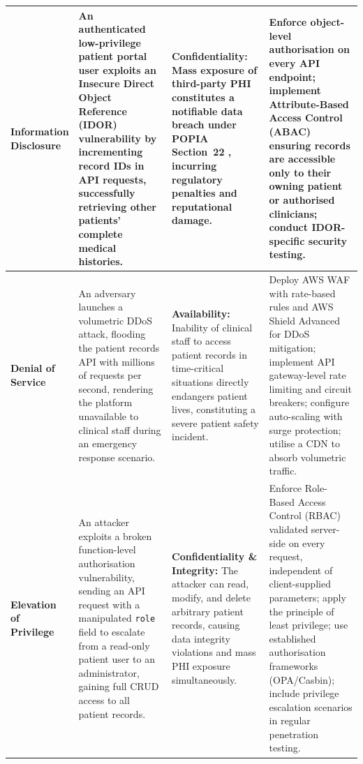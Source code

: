 \documentclass[12pt,a4paper]{article}
\begin{document}
\begin{longtable}{>{\bfseries\color{phaseblue}}p{2.6cm}
                   p{4.2cm}
                   p{3.4cm}
                   p{4.1cm}}
\midrule
\rowcolor{ctest!7}
\shortstack[l]{Information\\Disclosure} &
An authenticated low-privilege patient portal user exploits an Insecure Direct Object
Reference (IDOR) vulnerability by incrementing record IDs in API requests, successfully
retrieving other patients' complete medical histories. &
\textbf{Confidentiality:} Mass exposure of third-party PHI constitutes a notifiable data
breach under POPIA Section~22 \citep{popia2013}, incurring regulatory penalties and reputational damage. &
Enforce object-level authorisation on every API endpoint; implement Attribute-Based Access
Control (ABAC) ensuring records are accessible only to their owning patient or authorised
clinicians; conduct IDOR-specific security testing. \\

\midrule
\rowcolor{crelease!7}
\shortstack[l]{Denial of\\Service} &
An adversary launches a volumetric DDoS attack, flooding the patient records API with
millions of requests per second, rendering the platform unavailable to clinical staff
during an emergency response scenario. &
\textbf{Availability:} Inability of clinical staff to access patient records in time-critical
situations directly endangers patient lives, constituting a severe patient safety incident. &
Deploy AWS WAF with rate-based rules and AWS Shield Advanced for DDoS mitigation; implement
API gateway-level rate limiting and circuit breakers; configure auto-scaling with surge
protection; utilise a CDN to absorb volumetric traffic. \\

\midrule
\rowcolor{cdeploy!7}
\shortstack[l]{Elevation of\\Privilege} &
An attacker exploits a broken function-level authorisation vulnerability, sending an API
request with a manipulated \texttt{role} field to escalate from a read-only patient user
to an administrator, gaining full CRUD access to all patient records. &
\textbf{Confidentiality \& Integrity:} The attacker can read, modify, and delete arbitrary
patient records, causing data integrity violations and mass PHI exposure simultaneously. &
Enforce Role-Based Access Control (RBAC) validated server-side on every request,
independent of client-supplied parameters; apply the principle of least privilege; use
established authorisation frameworks (OPA/Casbin); include privilege escalation scenarios
in regular penetration testing. \\

\bottomrule
\end{longtable}
\renewcommand{\arraystretch}{1}
\end{document}
